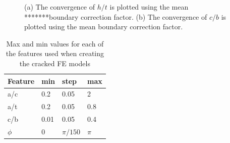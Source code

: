 \begin{figure}
    \centering
    \qquad
    \caption{(a) The convergence of $h/t$ is plotted using the mean *******boundary correction factor. (b) The convergence of $c/b$ is plotted using the mean boundary correction factor.}
    \label{fig:convergence_plots}
\end{figure}

\begin{table}[]
\centering
\begin{tabular}{|l|l|l|l|}
\hline
\textbf{Feature} & \textbf{min} & \textbf{step} & \textbf{max} \\ \hline
a/c              & 0.2          & 0.05          & 2            \\ \hline
a/t              & 0.2          & 0.05          & 0.8          \\ \hline
c/b              & 0.01         & 0.05          & 0.4          \\ \hline
$\phi$           & 0            & $\pi / 150$  & $\pi$        \\ \hline
\end{tabular}
\caption{Max and min values for each of the features used when creating the cracked FE models}
\label{table:feat_range}
\end{table}


